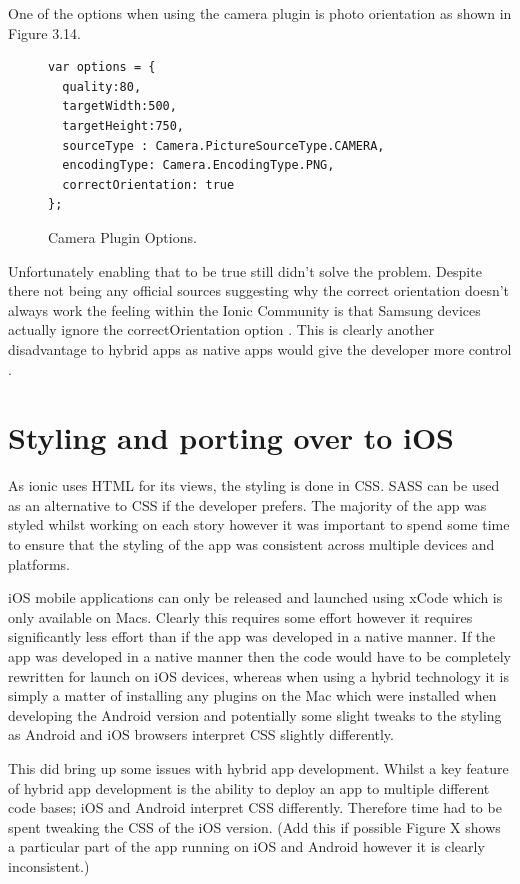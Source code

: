 One of the options when using the camera plugin is photo orientation as shown in Figure 3.14. 
\begin{center}
\begin{figure}[H]
\begin{verbatim}
var options = {
  quality:80,
  targetWidth:500,
  targetHeight:750,
  sourceType : Camera.PictureSourceType.CAMERA,
  encodingType: Camera.EncodingType.PNG,
  correctOrientation: true
};
\end{verbatim}
\caption{Camera Plugin Options.}
\end{figure}
\end{center}
Unfortunately enabling that to be true still didn't solve the problem. Despite there not being any official sources suggesting why the correct orientation doesn't always work the feeling within the Ionic Community is that Samsung devices actually ignore the correctOrientation option \cite{ioniccom1}. This is clearly another disadvantage to hybrid apps as native apps would give the developer more control \cite{androidcamera}.
\section{Styling and porting over to iOS}
As ionic uses HTML for its views, the styling is done in CSS. SASS can be used as an alternative to CSS if the developer prefers. The majority of the app was styled whilst working on each story however it was important to spend some time to ensure that the styling of the app was consistent across multiple devices and platforms.

iOS mobile applications can only be released and launched using xCode which is only available on Macs. Clearly this requires some effort however it requires significantly less effort than if the app was developed in a native manner. If the app was developed in a native manner then the code would have to be completely rewritten for launch on iOS devices, whereas when using a hybrid technology it is simply a matter of installing any plugins on the Mac which were installed when developing the Android version and potentially some slight tweaks to the styling as Android and iOS browsers interpret CSS slightly differently. 

This did bring up some issues with hybrid app development. Whilst a key feature of hybrid app development is the ability to deploy an app to multiple different code bases; iOS and Android interpret CSS differently. Therefore time had to be spent tweaking the CSS of the iOS version. (Add this if possible Figure X shows a particular part of the app running on iOS and Android however it is clearly inconsistent.)

